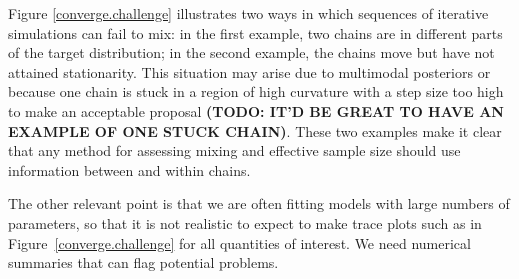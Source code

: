 \documentclass[11pt]{article}
\begin{document}
Figure \ref{converge.challenge} illustrates two ways in which sequences of iterative simulations can fail to mix:  in the first example, two chains are in different parts of the target distribution; in the second example, the chains move but have not attained stationarity.  This situation may arise due to multimodal posteriors or because one chain is stuck in a region of high curvature with a step size too high to make an acceptable proposal {\bf (TODO: IT'D BE GREAT TO HAVE AN EXAMPLE OF ONE STUCK CHAIN)}.  These two examples make it clear that any method for assessing mixing and effective sample size should use information between and within chains.

The other relevant point is that we are often fitting models with large numbers of parameters, so that it is not realistic to expect to make trace plots such as in Figure~\ref{converge.challenge} for all quantities of interest.  We need numerical summaries that can flag potential problems.
\end{document}
